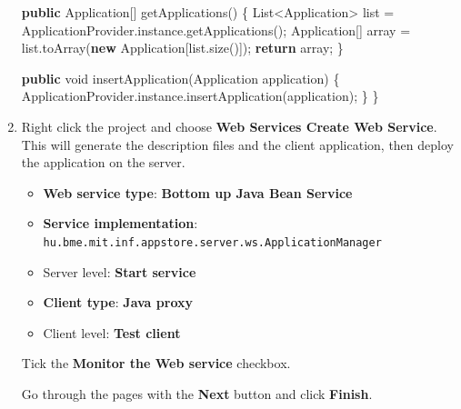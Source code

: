 \documentclass[]{report}
\newenvironment{Shaded}{}{}
\newcommand{\KeywordTok}[1]{\textcolor[rgb]{0.00,0.44,0.13}{\textbf{{#1}}}}
\newcommand{\DataTypeTok}[1]{\textcolor[rgb]{0.56,0.13,0.00}{{#1}}}
\newcommand{\FunctionTok}[1]{\textcolor[rgb]{0.02,0.16,0.49}{{#1}}}
\newcommand{\NormalTok}[1]{{#1}}
\begin{document}
\begin{enumerate}
\begin{Shaded}
\begin{Highlighting}[]
  \KeywordTok{public} \NormalTok{Application[] }\FunctionTok{getApplications}\NormalTok{() \{}
    \NormalTok{List<Application> list = ApplicationProvider.}\FunctionTok{instance}\NormalTok{.}\FunctionTok{getApplications}\NormalTok{();}
    \NormalTok{Application[] array = list.}\FunctionTok{toArray}\NormalTok{(}\KeywordTok{new} \NormalTok{Application[list.}\FunctionTok{size}\NormalTok{()]); }
    \KeywordTok{return} \NormalTok{array;}
  \NormalTok{\}}

  \KeywordTok{public} \DataTypeTok{void} \FunctionTok{insertApplication}\NormalTok{(Application application) \{}
    \NormalTok{ApplicationProvider.}\FunctionTok{instance}\NormalTok{.}\FunctionTok{insertApplication}\NormalTok{(application);}
  \NormalTok{\}}
\NormalTok{\}}
\end{Highlighting}
\end{Shaded}
\item
  Right click the project and choose \textbf{Web Services \textbar{}
  Create Web Service}. This will generate the description files and the
  client application, then deploy the application on the server.

  \begin{itemize}
  \itemsep1pt\parskip0pt
  \item
    \textbf{Web service type}: \textbf{Bottom up Java Bean Service}
  \item
    \textbf{Service implementation}:
    \texttt{hu.bme.mit.inf.appstore.server.ws.ApplicationManager}
  \item
    Server level: \textbf{Start service}
  \item
    \textbf{Client type}: \textbf{Java proxy}
  \item
    Client level: \textbf{Test client}
  \end{itemize}

  Tick the \textbf{Monitor the Web service} checkbox.

  Go through the pages with the \textbf{Next} button and click
  \textbf{Finish}.


\end{enumerate}
\end{document}
